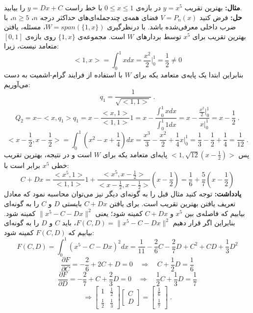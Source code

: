 	\textbf{مثال:}
	بهترین تقریب $y = x^5$ در بازه‌ی $0\leq x \leq 1$ با خط راست $y = Dx + C$ را بیابید.\\
	\textbf{حل:}
	فرض کنید $V = P_n(x)$ فضا‌ی همه‌ی چندجمله‌ای‌های حداکثر درجه $n$، $n\geq 5$، با ضرب داخلی معرفی‌شده باشد. با درنظرگیری $W = span(\{1,x\})$، مسئله، یافتن بهترین تقریب  برای $x^5$ توسط بردار‌های $W$ است. مجموعه‌ی $\{1,x\}$ روی بازه‌ی $[0,1]$ متعامد نیست، زیرا:
	$$<1,x> = \int_0^1 x dx = \frac{x^2}{2}\big|_0^1 = \frac{1}{2} \neq 0$$
	بنابراین ابتدا یک پایه‌ی متعامد یکه برای $W$ با استفاده از فرایند گرام-اشمیت به دست می‌آوریم:
	$$q_1 = \frac{1}{\sqrt{<1,1>}} \; .$$
	$$Q_2 = x - <x,q_1>q_1 = x - \frac{<x,1>}{<1,1>}1 = x - \frac{\int_0^1 x dx}{\int_0^1 1 dx} = x - \frac{\frac{x^2}{2}\big|_0^1}{x\big|_0^1} = x-\frac{1}{2}\; .$$
	$$<x-\frac{1}{2} , x-\frac{1}{2}> = \int_0^1 (x^2 - x +\frac{1}{4} ) dx = \frac{x^3}{3} - \frac{x^2}{2} + \frac{1}{4}x \big|_0^1 = \frac{1}{3} - \frac{1}{2} + \frac{1}{4} = \frac{1}{12}\; .$$
	پس
	 $<1 , \sqrt{12}(x-\frac{1}{2})>$
  پایه‌ای متعامد یکه برای $W$ است و در نتیجه، بهترین تقریب خطی $x^5$ برابر است با:
	$$C+Dx = \frac{<x^5,1>}{<1,1>}1+\frac{<x^5 , x-\frac{1}{2}>}{<x-\frac{1}{2},x-\frac{1}{2}>}(x-\frac{1}{2}) = \frac{1}{6}+\frac{5}{7}(x-\frac{1}{2})$$
	\textbf{یادداشت:}
	توجه کنید مثال قبل را به گونه‌ای دیگر نیز می‌توان محاسبه نمود که معادل تعریف یافتن بهترین تقریب است. برای یافتن $C+Dx$ بایستی $D$ و $C$ را به گونه‌ای بیابیم که فاصله‌ی بین $x^5$ و $C+Dx$ کمینه شود؛ یعنی $\parallel x^5-C-Dx \parallel^2$ کمینه شود. بنابراین اگر قرار دهیم  $F(C,D) = \parallel x^5 - C - Dx \parallel^2$، باید $C$ و $D$ را به گونه‌ای بیابیم که $F(C,D)$ کمینه شود:
	$$F(C,D) = \int_0^1  (x^5 - C - Dx)^2 dx = \frac{1}{11} - \frac{2}{6}C - \frac{2}{7}D + C^2 +CD + \frac{1}{3}D^2$$
	$$\frac{\partial F}{\partial C} = -\frac{2}{6}+ 2C +D = 0 \quad \Rightarrow \quad C+ \frac{1}{2}D = \frac{1}{6} $$
	$$\frac{\partial F}{\partial D} = -\frac{2}{7} +C + \frac{2}{3}D = 0 \quad \Rightarrow \quad \frac{1}{2} C + \frac{1}{3}D = \frac{1}{7}$$
	$$\Rightarrow \begin{bmatrix}
	1 & \frac{1}{2}\\
	\frac{1}{2} & \frac{1}{3}
	\end{bmatrix}\begin{bmatrix}
	C \\ D
	\end{bmatrix} = \begin{bmatrix}
	\frac{1}{6}\\
	\frac{1}{7}
	\end{bmatrix} \; .$$
	
